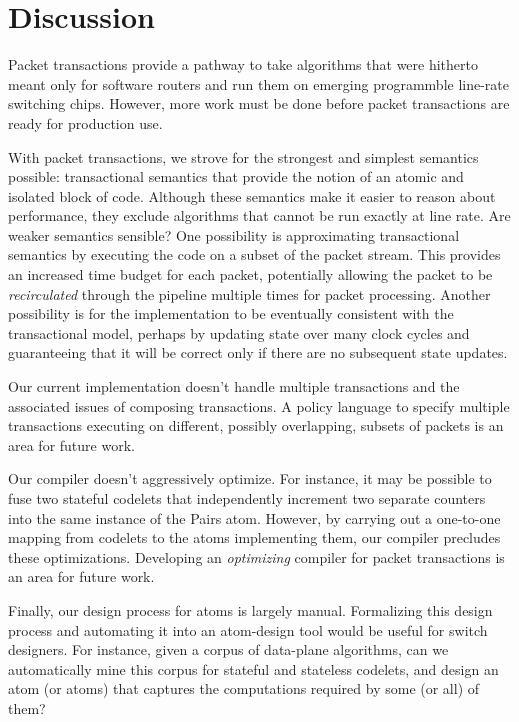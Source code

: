 \section{Discussion}
Packet transactions provide a pathway to take algorithms that were hitherto
meant only for software routers and run them on emerging programmble line-rate
switching chips. However, more work must be done before packet transactions
are ready for production use.

\begin{CompactEnumerate}
\item With packet transactions, we strove for the strongest and simplest
semantics possible: transactional semantics that provide the notion of an
atomic and isolated block of code. Although these semantics make it easier to
reason about performance, they exclude algorithms that cannot be run exactly at
line rate. Are weaker semantics sensible? One possibility is approximating
transactional semantics by executing the code on a subset of the packet stream.
This provides an increased time budget for each packet, potentially allowing
the packet to be {\em recirculated} through the pipeline multiple times
for packet processing. Another possibility is for the implementation to
be eventually consistent with the transactional model, perhaps by updating
state over many clock cycles and guaranteeing that it will be correct only if
there are no subsequent state updates.
\item Our current implementation doesn't handle multiple transactions and the
associated issues of composing transactions. A policy language to
specify multiple transactions executing on different, possibly overlapping,
subsets of packets is an area for future work.
\item Our compiler doesn't aggressively optimize. For instance, it may be
possible to fuse two stateful codelets that independently increment two
separate counters into the same instance of the Pairs atom. However, by
carrying out a one-to-one mapping from codelets to the atoms implementing them,
our compiler precludes these optimizations.  Developing an {\em optimizing}
compiler for packet transactions is an area for future work.
\item Finally, our design process for atoms is largely manual.  Formalizing
this design process and automating it into an atom-design tool would be useful
for switch designers. For instance, given a corpus of data-plane algorithms,
can we automatically mine this corpus for stateful and stateless codelets, and
design an atom (or atoms) that captures the computations required by some (or
all) of them?


\end{CompactEnumerate}
